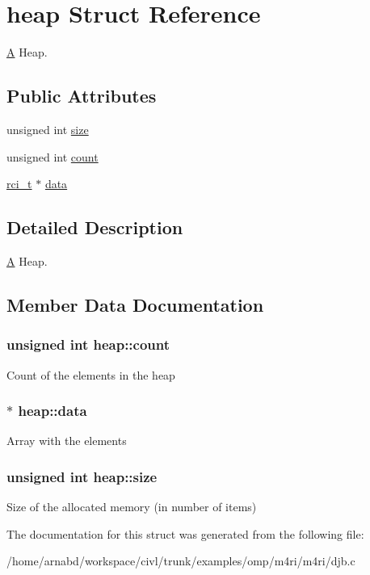 \hypertarget{structheap}{}\section{heap Struct Reference}
\label{structheap}


\hyperlink{structA}{A} Heap.  


\subsection*{Public Attributes}
\begin{DoxyCompactItemize}
\item 
unsigned int \hyperlink{structheap_aa4090dc6f9435d44f8a171d41fcefd2f}{size}
\item 
unsigned int \hyperlink{structheap_a536d4d09f41e8702fac43cdece626af7}{count}
\item 
\hyperlink{misc_8h_a03971b7935a6bc6fb77e74988850a136}{rci\+\_\+t} $\ast$ \hyperlink{structheap_ac53504d81ca1846cd10f13d121ddef23}{data}
\end{DoxyCompactItemize}


\subsection{Detailed Description}
\hyperlink{structA}{A} Heap. 

\subsection{Member Data Documentation}
\hypertarget{structheap_a536d4d09f41e8702fac43cdece626af7}{}
\subsubsection[{count}]{\setlength{\rightskip}{0pt plus 5cm}unsigned int heap\+::count}\label{structheap_a536d4d09f41e8702fac43cdece626af7}
Count of the elements in the heap \hypertarget{structheap_ac53504d81ca1846cd10f13d121ddef23}{}
\subsubsection[{data}]{$\ast$ heap\+::data}\label{structheap_ac53504d81ca1846cd10f13d121ddef23}
Array with the elements \hypertarget{structheap_aa4090dc6f9435d44f8a171d41fcefd2f}{}
\subsubsection[{size}]{\setlength{\rightskip}{0pt plus 5cm}unsigned int heap\+::size}\label{structheap_aa4090dc6f9435d44f8a171d41fcefd2f}
Size of the allocated memory (in number of items) 

The documentation for this struct was generated from the following file\+:\begin{DoxyCompactItemize}
\item 
/home/arnabd/workspace/civl/trunk/examples/omp/m4ri/m4ri/djb.\+c\end{DoxyCompactItemize}
